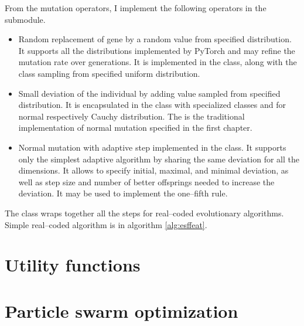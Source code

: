 From the mutation operators, I implement the following operators in the  submodule.
\begin{itemize}
    \item Random replacement of gene by a random value from specified distribution. It supports all the distributions implemented by PyTorch \citep{PyTorchDoc} and may refine the mutation rate over generations. It is implemented in the  class, along with the  class sampling from specified uniform distribution.
    \item Small deviation of the individual by adding value sampled from specified distribution. It is encapsulated in the  class with specialized classes  and  for normal respectively Cauchy distribution. The  is the traditional implementation of normal mutation specified in the first chapter.
    \item Normal mutation with adaptive step implemented in the  class. It supports only the simplest adaptive algorithm by sharing the same deviation for all the dimensions. It allows to specify initial, maximal, and minimal deviation, as well as step size and number of better offsprings needed to increase the deviation. It may be used to implement the one--fifth rule.
\end{itemize}

The  class wraps together all the steps for real--coded evolutionary algorithms. Simple real--coded algorithm is in algorithm \ref{alg:esffeat}.
    



\section{Utility functions}




\section{Particle swarm optimization}

